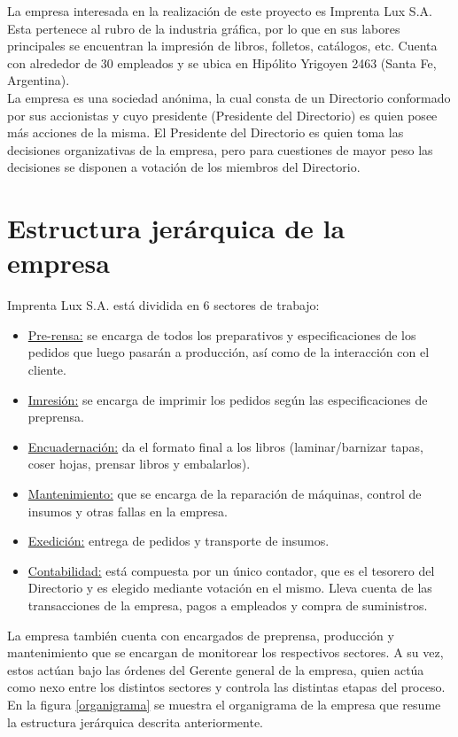 \documentclass[a4paper, 12pt,twoside]{report}  %
\numberwithin{equation}{subsection} %
\begin{document}
La empresa interesada en la realización de este proyecto es Imprenta Lux S.A. Esta pertenece al rubro de la industria gráfica, por lo que en sus labores principales se encuentran la impresión de libros, folletos, catálogos, etc. Cuenta con alrededor de 30
empleados y se ubica en Hipólito Yrigoyen 2463 (Santa Fe, Argentina).\\
\indent La empresa es una sociedad anónima, la cual consta de un Directorio conformado por sus
accionistas y cuyo presidente (Presidente del Directorio) es quien posee más acciones de la
misma. El Presidente del Directorio es quien toma las decisiones organizativas de la empresa, pero para cuestiones de mayor peso las decisiones se disponen a votación de los miembros del Directorio.

\section{Estructura jerárquica de la empresa}

Imprenta Lux S.A. está dividida en 6 sectores de trabajo:
\begin{itemize}
\item \underline{Pre-rensa:} se encarga de todos los preparativos y especificaciones de los pedidos que luego pasarán a producción, así como de la interacción con el cliente.
\item \underline{Imresión:} se encarga de imprimir los pedidos según las especificaciones de preprensa.
\item \underline{Encuadernación:} da el formato final a los libros (laminar/barnizar tapas, coser hojas, prensar libros y embalarlos).
\item \underline{Mantenimiento:} que se encarga de la reparación de máquinas, control de insumos y otras fallas en la empresa.
\item \underline{Exedición:} entrega de pedidos y transporte de insumos.
\item \underline{Contabilidad:} está compuesta por un único contador, que es el tesorero del Directorio y es elegido mediante votación en el mismo. Lleva cuenta de las transacciones de la empresa, pagos a empleados y compra de suministros.
\end{itemize}
\indent La empresa también cuenta con encargados de preprensa, producción y mantenimiento que se
encargan de monitorear los respectivos sectores. A su vez, estos actúan bajo las órdenes del
Gerente general de la empresa, quien actúa como nexo entre los distintos sectores y controla las
distintas etapas del proceso.\\
\indent En la figura \ref{organigrama} se muestra el organigrama de la empresa que resume la estructura jerárquica descrita anteriormente.
\end{document}
